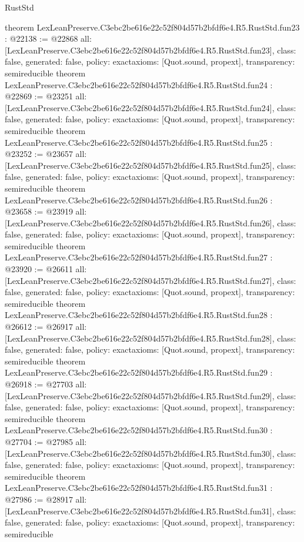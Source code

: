 \begin{lexlean}{RustStd}
\begin{coremodule}
{}
theorem LexLeanPreserve.C3ebc2be616e22c52f804d57b2bfdf6e4.R5.RustStd.fun23 : @22138 := @22868 {
  all: [LexLeanPreserve.C3ebc2be616e22c52f804d57b2bfdf6e4.R5.RustStd.fun23],
  class: false,
  generated: false,
  policy: exact{axioms: [Quot.sound, propext]},
  transparency: semireducible
}
theorem LexLeanPreserve.C3ebc2be616e22c52f804d57b2bfdf6e4.R5.RustStd.fun24 : @22869 := @23251 {
  all: [LexLeanPreserve.C3ebc2be616e22c52f804d57b2bfdf6e4.R5.RustStd.fun24],
  class: false,
  generated: false,
  policy: exact{axioms: [Quot.sound, propext]},
  transparency: semireducible
}
theorem LexLeanPreserve.C3ebc2be616e22c52f804d57b2bfdf6e4.R5.RustStd.fun25 : @23252 := @23657 {
  all: [LexLeanPreserve.C3ebc2be616e22c52f804d57b2bfdf6e4.R5.RustStd.fun25],
  class: false,
  generated: false,
  policy: exact{axioms: [Quot.sound, propext]},
  transparency: semireducible
}
theorem LexLeanPreserve.C3ebc2be616e22c52f804d57b2bfdf6e4.R5.RustStd.fun26 : @23658 := @23919 {
  all: [LexLeanPreserve.C3ebc2be616e22c52f804d57b2bfdf6e4.R5.RustStd.fun26],
  class: false,
  generated: false,
  policy: exact{axioms: [Quot.sound, propext]},
  transparency: semireducible
}
theorem LexLeanPreserve.C3ebc2be616e22c52f804d57b2bfdf6e4.R5.RustStd.fun27 : @23920 := @26611 {
  all: [LexLeanPreserve.C3ebc2be616e22c52f804d57b2bfdf6e4.R5.RustStd.fun27],
  class: false,
  generated: false,
  policy: exact{axioms: [Quot.sound, propext]},
  transparency: semireducible
}
theorem LexLeanPreserve.C3ebc2be616e22c52f804d57b2bfdf6e4.R5.RustStd.fun28 : @26612 := @26917 {
  all: [LexLeanPreserve.C3ebc2be616e22c52f804d57b2bfdf6e4.R5.RustStd.fun28],
  class: false,
  generated: false,
  policy: exact{axioms: [Quot.sound, propext]},
  transparency: semireducible
}
theorem LexLeanPreserve.C3ebc2be616e22c52f804d57b2bfdf6e4.R5.RustStd.fun29 : @26918 := @27703 {
  all: [LexLeanPreserve.C3ebc2be616e22c52f804d57b2bfdf6e4.R5.RustStd.fun29],
  class: false,
  generated: false,
  policy: exact{axioms: [Quot.sound, propext]},
  transparency: semireducible
}
theorem LexLeanPreserve.C3ebc2be616e22c52f804d57b2bfdf6e4.R5.RustStd.fun30 : @27704 := @27985 {
  all: [LexLeanPreserve.C3ebc2be616e22c52f804d57b2bfdf6e4.R5.RustStd.fun30],
  class: false,
  generated: false,
  policy: exact{axioms: [Quot.sound, propext]},
  transparency: semireducible
}
theorem LexLeanPreserve.C3ebc2be616e22c52f804d57b2bfdf6e4.R5.RustStd.fun31 : @27986 := @28917 {
  all: [LexLeanPreserve.C3ebc2be616e22c52f804d57b2bfdf6e4.R5.RustStd.fun31],
  class: false,
  generated: false,
  policy: exact{axioms: [Quot.sound, propext]},
  transparency: semireducible
}
\end{coremodule}
\end{lexlean}
